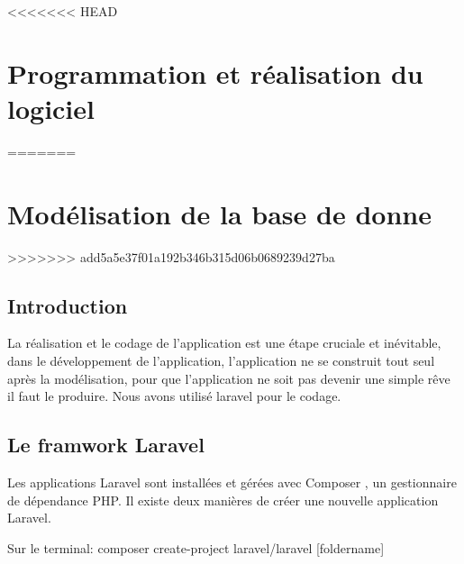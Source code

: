 <<<<<<< HEAD
 \chapter{Programmation et réalisation du logiciel}
=======
\chapter{Modélisation de la base de donne}
>>>>>>> add5a5e37f01a192b346b315d06b0689239d27ba
\minitoc
\newpage
\section{Introduction}
	  La réalisation et le codage de l'application est une étape cruciale et inévitable,  dans le développement de l'application, l'application ne se construit tout seul après la modélisation, pour que l'application ne soit pas devenir une simple rêve il faut le produire.
	  \medskip
	  Nous avons utilisé laravel pour le codage.
	  
	  
	  \section{Le framwork Laravel}
	  
	  Les applications Laravel sont installées et gérées avec Composer , un gestionnaire de
	  dépendance PHP. Il existe deux manières de créer une nouvelle application Laravel.
	  
	 Sur le terminal:
	  composer create-project laravel/laravel [foldername]